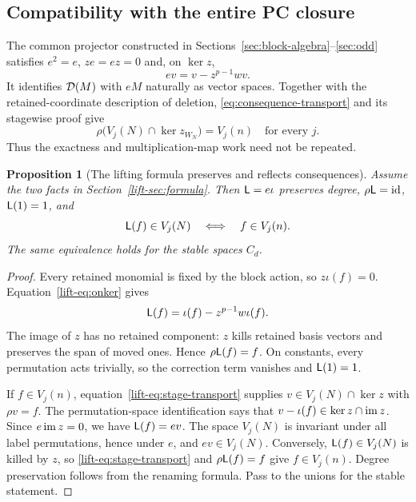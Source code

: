 \documentclass[11pt,a4paper]{article}
\newtheorem{proposition}[theorem]{Proposition}
\theoremstyle{definition}\newtheorem{definition}[theorem]{Definition}
\theoremstyle{remark}\newtheorem{remark}[theorem]{Remark}
\begin{document}
\subsection{Compatibility with the entire PC closure}\label{lift-sec:verify}
The common projector constructed in Sections~\ref{sec:block-algebra}--\ref{sec:odd}
satisfies $e^2=e$, $ze=ez=0$ and, on $\ker z$,
\begin{equation}\label{lift-eq:onker}
                       ev=v-z^{p-1}wv.
\end{equation}
It identifies $\mathcal D(M)$ with $eM$ naturally as vector spaces.
Together with the retained-coordinate description of deletion,
\eqref{eq:consequence-transport} and its stagewise proof give
\begin{equation}\label{lift-eq:stage-transport}
 \rho\bigl(V_j(N)\cap\ker z_{W_N}\bigr)=V_j(n)\quad\text{for every }j.
\end{equation}
Thus the exactness and multiplication-map work need not be repeated.

\begin{proposition}[The lifting formula preserves and reflects consequences]\label{lift-prop:lift}
Assume the two facts in Section~\ref{lift-sec:formula}. Then
$\mathsf L=e\iota$ preserves degree, $\rho\mathsf L=\mathrm{id}$,
$\mathsf L(1)=1$, and
\[
                  \mathsf L(f)\in V_j(N)\quad\Longleftrightarrow\quad
                  f\in V_j(n).
\]
The same equivalence holds for the stable spaces $C_d$.
\end{proposition}
\begin{proof}
Every retained monomial is fixed by the block action, so $z\iota(f)=0$.
Equation~\eqref{lift-eq:onker} gives
\[
                  \mathsf L(f)=\iota(f)-z^{p-1}w\iota(f).
\]
The image of $z$ has no retained component: $z$ kills retained basis
vectors and preserves the span of moved ones. Hence $\rho\mathsf L(f)=f$.
On constants, every permutation acts trivially, so the correction term
vanishes and $\mathsf L(1)=1$.

If $f\in V_j(n)$, equation~\eqref{lift-eq:stage-transport} supplies
$v\in V_j(N)\cap\ker z$ with $\rho v=f$. The permutation-space
identification says that $v-\iota(f)\in\ker z\cap\operatorname{im} z$. Since
$e\operatorname{im} z=0$, we have $\mathsf L(f)=ev$. The space $V_j(N)$ is invariant
under all label permutations, hence under $e$, and $ev\in V_j(N)$.
Conversely, $\mathsf L(f)\in V_j(N)$ is killed by $z$, so
\eqref{lift-eq:stage-transport} and $\rho\mathsf L(f)=f$ give $f\in V_j(n)$.
Degree preservation follows from the renaming formula. Pass to the
unions for the stable statement.
\end{proof}
\end{document}
